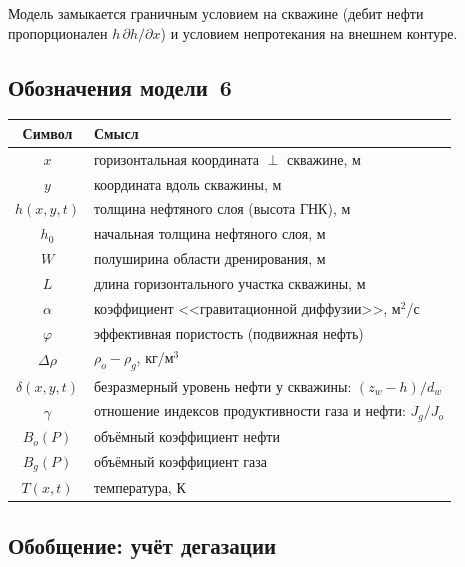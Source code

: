 \documentclass[12pt,a4paper]{article}
\begin{document}
Модель замыкается граничным условием на скважине (дебит нефти
пропорционален $h\,\partial h/\partial x$) и условием непротекания
на внешнем контуре.

\subsection{Обозначения модели~6}

\begin{center}
\renewcommand{\arraystretch}{1.25}
\begin{tabular}{cl}
  \hline
  Символ & Смысл \\
  \hline
  $x$                    & горизонтальная координата $\perp$ скважине, м \\
  $y$                    & координата вдоль скважины, м \\
  $h(x,y,t)$            & толщина нефтяного слоя (высота ГНК), м \\
  $h_0$                  & начальная толщина нефтяного слоя, м \\
  $W$                    & полуширина области дренирования, м \\
  $L$                    & длина горизонтального участка скважины, м \\
  $\alpha$               & коэффициент <<гравитационной диффузии>>, м$^2$/с \\
  $\varphi$              & эффективная пористость (подвижная нефть) \\
  $\Delta\rho$           & $\rho_o - \rho_g$, кг/м$^3$ \\
  $\delta(x,y,t)$        & безразмерный уровень нефти у скважины: $(z_w - h)/d_w$ \\
  $\gamma$               & отношение индексов продуктивности газа и нефти: $J_g/J_o$ \\
  $B_o(P)$               & объёмный коэффициент нефти \\
  $B_g(P)$               & объёмный коэффициент газа \\
  $T(x,t)$               & температура, К \\
  \hline
\end{tabular}
\end{center}

\subsection{Обобщение: учёт дегазации}
\end{document}
